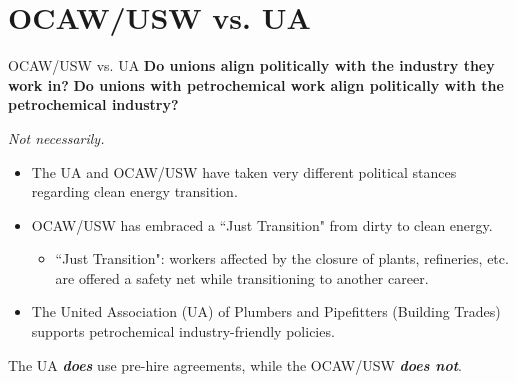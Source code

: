 \documentclass{beamer}
\begin{document}

\section*{OCAW/USW vs. UA}
\begin{frame}{OCAW/USW vs. UA}
\textbf{Do unions align politically with the industry they work in?}\newline
\textbf{Do unions with petrochemical work align politically with the petrochemical industry?}\newline

\emph{Not necessarily.}
	\begin{itemize}
		\item The UA and OCAW/USW have taken very different political stances regarding clean energy transition.
		\item OCAW/USW has embraced a ``Just Transition" from dirty to clean energy.
	\begin{itemize}
		\item ``Just Transition": workers affected by the closure of plants, refineries, etc. are offered a safety net while transitioning to another career.
	\end{itemize}
	\item The United Association (UA) of Plumbers and Pipefitters (Building Trades) supports petrochemical industry-friendly policies.
	\end{itemize}
The UA \textit{\textbf{does}} use pre-hire agreements, while the OCAW/USW \textbf{\textit{does not}}.
\end{frame}
\end{document}
